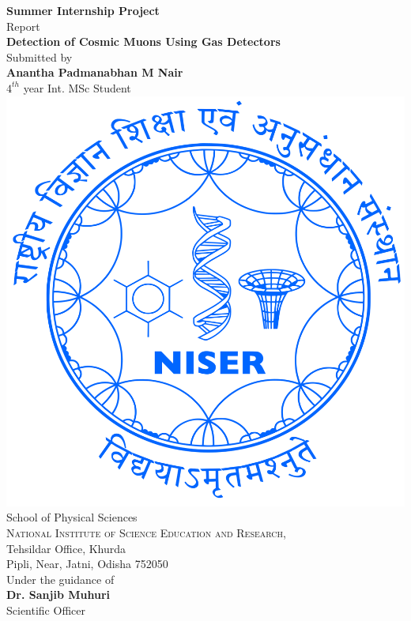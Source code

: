 \documentclass{article}
\begin{document}
\begin{titlepage}

    \begin{center}
    
    
    
    \textup{\Large {\bf Summer Internship Project} \\ Report}\\[0.3in]
    
    \Large \textbf {Detection of Cosmic Muons Using Gas Detectors}\\[0.7in]
    
    
           
    
    \normalsize Submitted by \\[0.2in]
    \textbf{Anantha Padmanabhan M Nair}\\
    \normalsize
    $4^{th}$ year Int. MSc Student\\[0.1in]
    
    \includegraphics[width=0.25 \textwidth]{NISER.png}\\[0.1in]
    \Large{School of Physical Sciences}\\
    \normalsize
    \textsc{National Institute of Science Education and Research},\\
    Tehsildar Office, Khurda\\
    Pipli, Near, Jatni, Odisha 752050\\
    
    
    
    
    
    \vspace{.2in}
    Under the guidance of\\[0.2in]
    \textbf{Dr. Sanjib Muhuri}\\
    Scientific Officer
    
    
    
    \vspace{.3in}
    

\end{center}
\end{titlepage}
\end{document}
